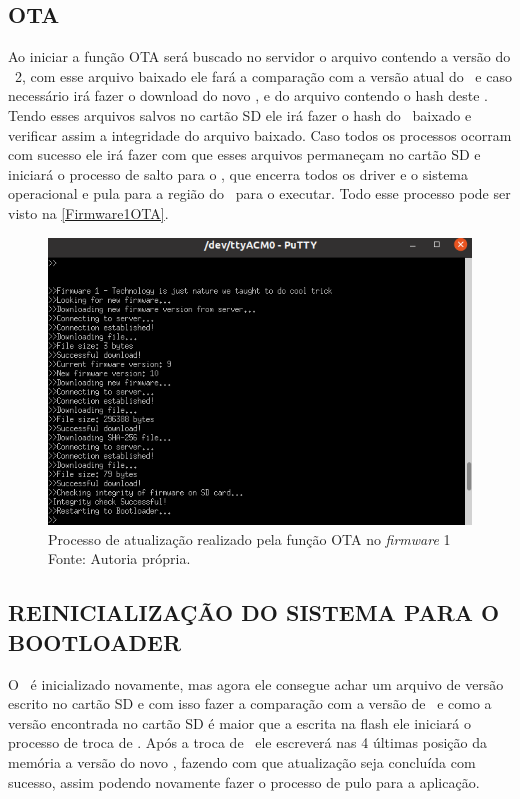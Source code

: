 \subsection{OTA}
Ao iniciar a função OTA será buscado no servidor o arquivo contendo a versão do \firmware\ 2, com esse arquivo baixado ele fará a comparação com a versão atual do \firmware\ e caso necessário irá fazer o download do novo \firmware, e do arquivo contendo o hash deste \firmware. Tendo esses arquivos salvos no cartão SD ele irá fazer o hash do \firmware\ baixado e verificar assim a integridade do arquivo baixado. Caso todos os processos ocorram com sucesso ele irá fazer com que esses arquivos permaneçam no cartão SD e iniciará o processo de salto para o \bootloader, que encerra todos os driver e o sistema operacional e pula para a região do \bootloader\ para o executar. Todo esse processo pode ser visto na \autoref{Firmware1OTA}.

\begin{figure}[H]
    \scriptsize
     \centering
     \includegraphics[scale=0.9]{dados/figuras/Firmware1.png}
     \caption{Processo de atualização realizado pela função OTA no \textit{firmware} 1 \newline Fonte: Autoria própria.}
     \label{Firmware1OTA}
\end{figure}

\subsection{REINICIALIZAÇÃO DO SISTEMA PARA O BOOTLOADER}
O \bootloader\ é inicializado novamente, mas agora ele consegue achar um arquivo de versão escrito no cartão SD e com isso fazer a comparação com a versão de \firmware\ e como a versão encontrada no cartão SD é maior que a escrita na flash ele iniciará o processo de troca de \firmware.
Após a troca de \firmware\ ele escreverá nas 4 últimas posição da memória a versão do novo \firmware, fazendo com que atualização seja concluída com sucesso, assim podendo novamente fazer o processo de pulo para a aplicação.
